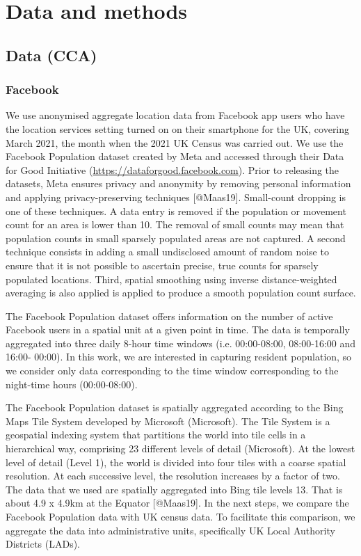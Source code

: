 \documentclass[]{rsos}%
\begin{document}
\hypertarget{data-and-methods}{%
\section{Data and methods}\label{data-and-methods}}

\hypertarget{data-cca}{%
\subsection{Data (CCA)}\label{data-cca}}

\hypertarget{facebook}{%
\subsubsection{Facebook}\label{facebook}}

We use anonymised aggregate location data from Facebook app users who
have the location services setting turned on on their smartphone for the
UK, covering March 2021, the month when the 2021 UK Census was carried
out. We use the Facebook Population dataset created by Meta and accessed
through their Data for Good Initiative
(\url{https://dataforgood.facebook.com}). Prior to releasing the datasets,
Meta ensures privacy and anonymity by removing personal information and
applying privacy-preserving techniques {[}@Maas19{]}. Small-count dropping
is one of these techniques. A data entry is removed if the population or
movement count for an area is lower than 10. The removal of small counts
may mean that population counts in small sparsely populated areas are
not captured. A second technique consists in adding a small undisclosed
amount of random noise to ensure that it is not possible to ascertain
precise, true counts for sparsely populated locations. Third, spatial
smoothing using inverse distance-weighted averaging is also applied is
applied to produce a smooth population count surface.

The Facebook Population dataset offers information on the number of
active Facebook users in a spatial unit at a given point in time. The
data is temporally aggregated into three daily 8-hour time windows (i.e.
00:00-08:00, 08:00-16:00 and 16:00- 00:00). In this work, we are
interested in capturing resident population, so we consider only data
corresponding to the time window corresponding to the night-time hours
(00:00-08:00).

The Facebook Population dataset is spatially aggregated according to the
Bing Maps Tile System developed by Microsoft (Microsoft). The Tile
System is a geospatial indexing system that partitions the world into
tile cells in a hierarchical way, comprising 23 different levels of
detail (Microsoft). At the lowest level of detail (Level 1), the world
is divided into four tiles with a coarse spatial resolution. At each
successive level, the resolution increases by a factor of two. The data
that we used are spatially aggregated into Bing tile levels 13. That is
about 4.9 x 4.9km at the Equator {[}@Maas19{]}. In the next steps, we
compare the Facebook Population data with UK census data. To facilitate
this comparison, we aggregate the data into administrative units,
specifically UK Local Authority Districts (LADs).
\end{document}
